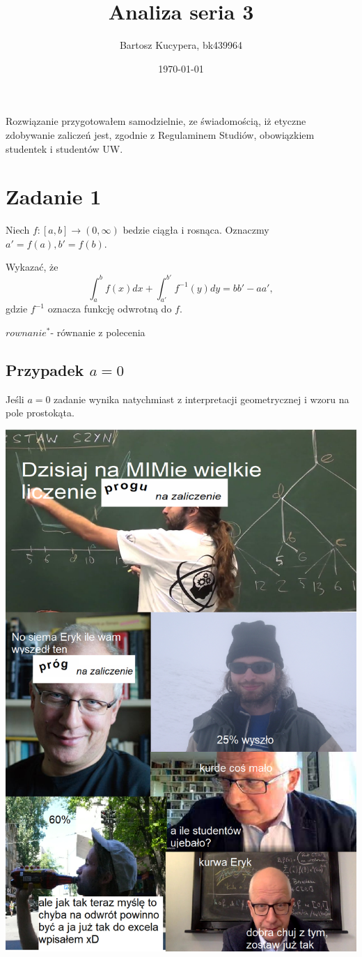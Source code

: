 \documentclass{article}
\title{Analiza seria 3}
\author{Bartosz Kucypera, bk439964}
\date{\today}
\def\rw{$rownanie^*$}
\begin{document}
\maketitle

Rozwiązanie przygotowałem samodzielnie, ze świadomością, iż etyczne zdobywanie zaliczeń jest, zgodnie z Regulaminem Studiów, obowiązkiem studentek i studentów UW.

\section*{Zadanie 1}
Niech $f:[a,b] \to (0,\infty)$ bedzie ciągła i rosnąca. Oznaczmy $a'=f(a),b'=f(b)$.

Wykazać, że 
$$\int_a^bf(x)dx+\int_{a'}^{b'}f^{-1}(y)dy=bb' - aa',$$
gdzie $f^{-1}$ oznacza funkcję odwrotną do $f$.

\rw - równanie z polecenia

\subsection*{Przypadek $a=0$}
Jeśli $a=0$ zadanie wynika natychmiast z interpretacji geometrycznej i wzoru na pole prostokąta.

\includegraphics[scale=0.2]{jd.png}
\end{document}

